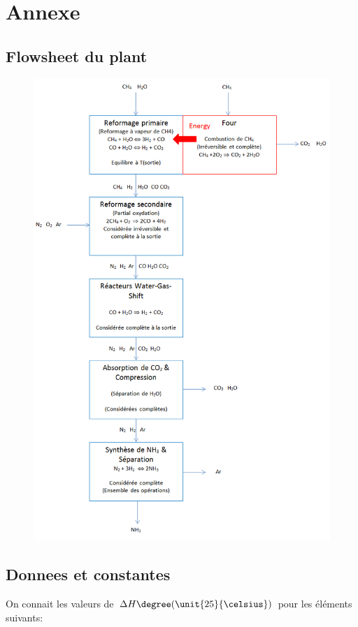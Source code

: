 \newpage
\appendix
\section{Annexe}

\subsection{Flowsheet du plant}

\begin{figure}[!h]
\centering
   \includegraphics[scale=0.5]{flowsh.png}
\end{figure}

\newpage

\subsection{Donnees et constantes}
On connait les valeurs de $\Delta H\degree (\unit{25}{\celsius})$ pour les éléments suivants:

